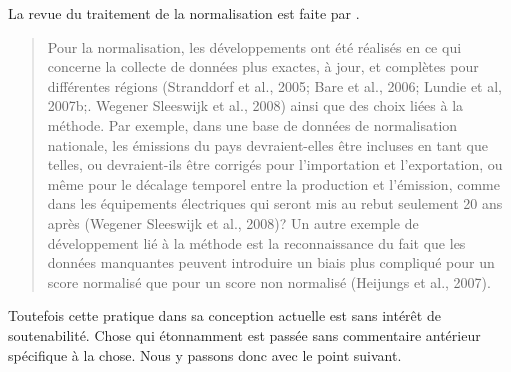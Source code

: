 La revue du traitement de la normalisation est faite par \citeauthor{finnveden_recent_2009}\cite{finnveden_recent_2009}.
\blockcquote[traduction]{finnveden_recent_2009}{
Pour la normalisation, les développements ont été réalisés en ce qui concerne la collecte de données plus exactes, à jour, et complètes pour différentes régions (Stranddorf et al., 2005; Bare et al., 2006; Lundie et al, 2007b;. Wegener Sleeswijk et al., 2008) ainsi que des choix liées à la méthode.
Par exemple, dans une base de données de normalisation nationale, les émissions du pays devraient-elles être incluses en tant que telles, ou devraient-ils être corrigés pour l'importation et l'exportation, ou même pour le décalage temporel entre la production et l'émission, comme dans les équipements électriques qui seront mis au rebut seulement 20 ans après (Wegener Sleeswijk et al., 2008)?
Un autre exemple de développement lié à la méthode est la reconnaissance du fait que les données manquantes peuvent introduire un biais plus compliqué pour un score normalisé que pour un score non normalisé (Heijungs et al., 2007).
}

Toutefois cette pratique dans sa conception actuelle est sans intérêt de soutenabilité.
Chose qui étonnamment est passée sans commentaire antérieur spécifique à la chose.
Nous y passons donc avec le point suivant.


